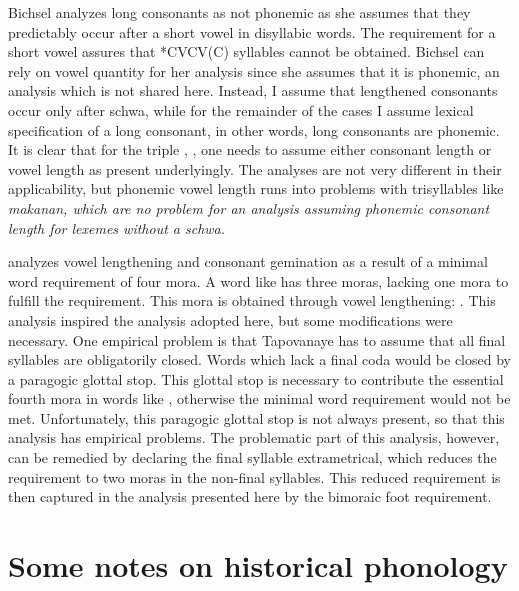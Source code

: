 Bichsel analyzes long consonants as not phonemic as she assumes that they predictably occur after a short vowel in disyllabic words. The requirement for a short vowel assures that *CV\textipa{:}C\textipa{:}V(C) syllables cannot be obtained. Bichsel can rely on vowel quantity for her analysis since she assumes that it is phonemic, an analysis which is not shared here. Instead, I assume that lengthened consonants occur only after schwa, while for the remainder of the cases I assume lexical specification of a long consonant, in other words, long consonants are phonemic. It is clear that for the triple , ,  one needs to assume either consonant length or vowel length as present underlyingly. The analyses are not very different in their applicability, but phonemic vowel length runs into problems with trisyllables like \em makanan\em, which are no problem for an analysis assuming phonemic consonant length for lexemes without a schwa.


\citet{Tapovanaye1995} analyzes vowel lengthening and consonant gemination as a result of a minimal word requirement of four mora. A word like  has three moras, lacking one mora to fulfill the requirement. This mora is obtained through vowel lengthening: . This analysis inspired the analysis adopted here, but some modifications were necessary. One empirical problem is that Tapovanaye has to assume that all final syllables are obligatorily closed. Words which lack a final coda would be closed by a paragogic glottal stop. This glottal stop is necessary to contribute the essential fourth mora in words like  , otherwise the minimal word requirement would not be met. Unfortunately, this paragogic glottal stop is not always present, so that this analysis has empirical problems. The problematic part of this analysis, however, can be remedied by declaring the final syllable extrametrical, which reduces the requirement to two moras in the non-final syllables. This reduced requirement is then captured in the analysis presented here by the bimoraic foot requirement.

% 


\section{Some notes on historical phonology}\label{sec:phon:Somenotesonhistoricalphonology}
